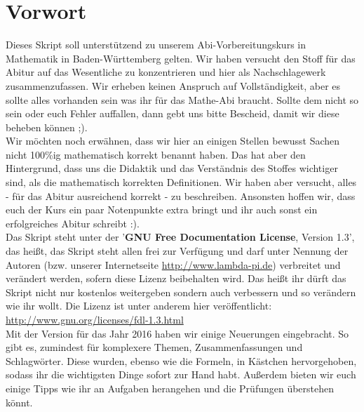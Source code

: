 \chapter*{Vorwort}
	 Dieses Skript soll unterstützend zu unserem Abi-Vorbereitungskurs in Mathematik
	in Baden-Württemberg gelten. Wir haben versucht den Stoff für das Abitur auf
	das Wesentliche zu konzentrieren und hier als Nachschlagewerk zusammenzufassen.
	Wir erheben keinen Anspruch auf Vollständigkeit, aber es sollte alles vorhanden
	sein was ihr für das Mathe-Abi braucht. Sollte dem nicht so sein oder euch
	Fehler auffallen, dann gebt uns bitte Bescheid, damit wir diese beheben können
	;).\\
	Wir möchten noch erwähnen, dass wir hier an einigen Stellen bewusst Sachen
	nicht 100\%ig mathematisch korrekt benannt haben. Das hat aber den Hintergrund,
	dass uns die Didaktik und das Verständnis des Stoffes wichtiger sind, als die
	mathematisch korrekten Definitionen. Wir haben aber versucht, alles - für das
	Abitur ausreichend korrekt - zu beschreiben. Ansonsten hoffen wir, dass euch
	der Kurs ein paar Notenpunkte extra bringt und ihr auch sonst ein erfolgreiches
	Abitur schreibt :).\\
	Das Skript steht unter der '\textbf{GNU Free Documentation License}, Version
	1.3', das heißt, das Skript steht allen frei zur Verfügung und darf unter
	Nennung der Autoren (bzw. unserer Internetseite \url{http://www.lambda-pi.de})
	verbreitet und verändert werden, sofern diese Lizenz beibehalten wird. Das
	heißt ihr dürft das Skript nicht nur kostenlos weitergeben sondern auch
	verbessern und so verändern wie ihr wollt. Die Lizenz ist unter anderem hier
	veröffentlicht:\\
	\url{http://www.gnu.org/licenses/fdl-1.3.html}\\
	Mit der Version für das Jahr 2016 haben wir einige Neuerungen eingebracht. So
	gibt es, zumindest für komplexere Themen, Zusammenfassungen und Schlagwörter.
	Diese wurden, ebenso wie die Formeln, in Kästchen hervorgehoben, sodass ihr die
	wichtigsten Dinge sofort zur Hand habt. Außerdem bieten wir euch einige Tipps
	wie ihr an Aufgaben herangehen und die Prüfungen überstehen könnt.
